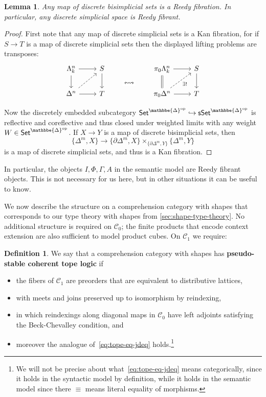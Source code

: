 \documentclass{amsart}
\theoremstyle{plain}
\newtheorem{lem}[thm]{Lemma}
\theoremstyle{definition}
\newtheorem{defn}[thm]{Definition}
\theoremstyle{remark}
\numberwithin{equation}{section}
\newcommand{\jdeq}{\equiv}
\newcommand{\Set}{\mathsf{Set}}
\newcommand{\sSet}{\mathsf{sSet}}
\newcommand{\DDelta}{\mathbbe{\Delta}}
\newcommand{\op}{\mathrm{op}}
\newcommand{\C}{\mathcal{C}}
\begin{document}
\begin{lem}\label{lem:discrete-reedy} Any map of discrete bisimplicial sets is a Reedy fibration. In particular, any discrete simplicial space is Reedy fibrant.
\end{lem}
\begin{proof}
First note that any map of discrete simplicial sets is a Kan fibration, for if $S \to T$ is a map of discrete simplicial sets then the displayed lifting problems are transposes:
\[
\begin{tikzcd} \Lambda^n_k \arrow[r] \arrow[d] & S \arrow[d]  & \arrow[d, phantom, "{\leftrightsquigarrow}" description] & \pi_0 \Lambda^n_k \arrow[d, equals] \arrow[r] & S \arrow[d] \\ \Delta^n \arrow[ur, dashed] \arrow[r] & T & ~ & \pi_0 \Delta^n \arrow[r] \arrow[ur, dashed, "{\exists !}"'] & T
\end{tikzcd}
\]

Now the discretely embedded subcategory $\Set^{\DDelta^\op}\hookrightarrow \sSet^{\DDelta^\op}$ is reflective and coreflective and thus closed under weighted limits with any weight $W \in \Set^{\DDelta^\op}$. If $X \to Y$ is a map of discrete bisimplicial sets, then
\[ \{ \Delta^m,X\} \to \{\partial\Delta^m,X\} \times_{\{\partial\Delta^m,Y\}} \{\Delta^m , Y\}\] is a map of discrete simplicial sets, and thus is a Kan fibration.
\end{proof}

In particular, the objects $I,\Phi,\Gamma,A$ in the semantic model are Reedy fibrant objects.
This is not necessary for us here, but in other situations it can be useful to know.

We now describe the structure on a comprehension category with shapes that corresponds to our type theory with shapes from \cref{sec:shape-type-theory}.
No additional structure is required on $\C_0$; the finite products that encode context extension are also sufficient to model product cubes.
On $\C_1$ we require:

\begin{defn}\label{defn:cc-topelogic}
  We say that a comprehension category with shapes has \textbf{pseudo-stable coherent tope logic} if
  \begin{itemize}
  \item the fibers of $\C_1$ are preorders that are equivalent to distributive lattices, 
  \item with meets and joins preserved up to isomorphism by reindexing, 
  \item in which reindexings along diagonal maps in $\C_0$ have left adjoints satisfying the Beck-Chevalley condition, and 
  \item moreover the analogue of~\eqref{eq:tope-eq-jdeq} holds.\footnote{We will not be precise about what~\eqref{eq:tope-eq-jdeq} means categorically, since it holds in the syntactic model by definition, while it holds in the semantic model since there $\jdeq$ means literal equality of morphisms.}
  \end{itemize}
\end{defn}
\end{document}
